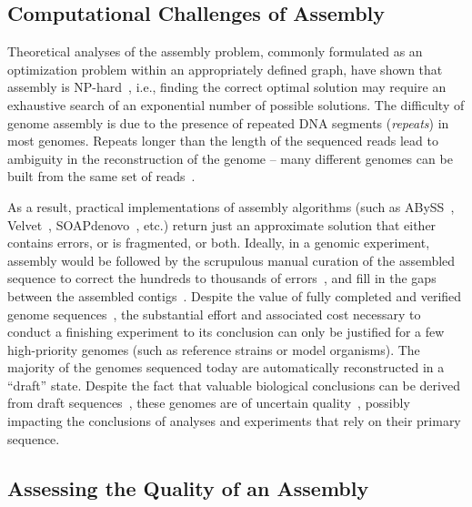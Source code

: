 \subsection{Computational Challenges of Assembly}

Theoretical analyses of the assembly problem, commonly formulated as
an optimization problem within an appropriately defined graph, have
shown that assembly is
NP-hard~\cite{myers1995,medvedev2007computability}, i.e., finding the
correct optimal solution may require an exhaustive search of an
exponential number of possible solutions.  The difficulty of genome
assembly is due to the presence of repeated DNA
segments (\emph{repeats}) in most genomes. Repeats longer than the length of the sequenced reads lead to ambiguity in the reconstruction of the genome
-- many different genomes can be built from the same set of
reads~\cite{nagarajan2009complexity,kingsford2010assembly}.

As a result, practical implementations of assembly algorithms (such as
ABySS~\cite{ABySS}, Velvet~\cite{Velvet},
SOAPdenovo~\cite{li2010novo}, etc.) return just an approximate
solution that either contains errors, or is fragmented, or both.
Ideally, in a genomic experiment, assembly would be followed by the
scrupulous manual curation of the assembled sequence to correct the
hundreds to thousands of errors~\cite{salzberg2005misassemblies}, and
fill in the gaps between the assembled
contigs~\cite{nagarajan2010finishing}. Despite the value of fully
completed and verified genome sequences~\cite{fraser2002value}, the
substantial effort and associated cost necessary to conduct a
finishing experiment to its conclusion can only be justified for a
few high-priority genomes (such as reference strains or model
organisms). The majority of the genomes sequenced today are
automatically reconstructed in a ``draft'' state.  Despite the fact
that valuable biological conclusions can be derived from draft
sequences~\cite{branscomb2002high}, these genomes are of uncertain
quality~\cite{chain2009genome}, possibly impacting the conclusions of
analyses and experiments that rely on their primary sequence.

\subsection{Assessing the Quality of an Assembly}


